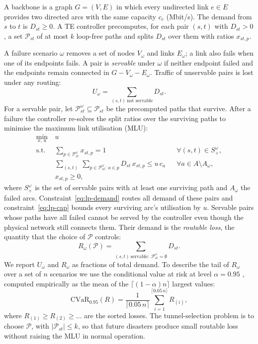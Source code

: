 \documentclass[preprint,12pt]{elsarticle}
\begin{document}
A backbone is a graph $G=(V,E)$ in which every undirected link $e\in E$ provides two directed arcs with the same capacity $c_e$ (Mbit/s). The demand from $s$ to $t$ is $D_{st}\ge 0$. A TE controller precomputes, for each pair $(s,t)$ with $D_{st}>0$, a set $\mathcal{P}_{st}$ of at most $k$ loop-free paths and splits $D_{st}$ over them with ratios $x_{st,p}$.

A failure scenario $\omega$ removes a set of nodes $V_\omega$ and links $E_\omega$; a link also fails when one of its endpoints fails. A pair is \emph{servable} under $\omega$ if neither endpoint failed and the endpoints remain connected in $G-V_\omega-E_\omega$. Traffic of unservable pairs is lost under any routing:
\begin{equation}
U_\omega=\sum_{(s,t)\ \text{not servable}} D_{st}.
\label{eq:unservable}
\end{equation}
For a servable pair, let $\mathcal{P}^{\omega}_{st}\subseteq\mathcal{P}_{st}$ be the precomputed paths that survive. After a failure the controller re-solves the split ratios over the surviving paths to minimise the maximum link utilisation (MLU):
\begin{align}
\min_{x,\,u}\ & u \label{eq:lp}\\
\text{s.t.}\ & \sum_{p\in\mathcal{P}^{\omega}_{st}} x_{st,p}=1 && \forall (s,t)\in S^\omega_{+}, \label{eq:lp-demand}\\
& \sum_{(s,t)}\ \sum_{p\in\mathcal{P}^{\omega}_{st}:\,a\in p} D_{st}\,x_{st,p}\le u\,c_a && \forall a\in A\setminus A_\omega, \label{eq:lp-cap}\\
& x_{st,p}\ge 0, \nonumber
\end{align}
where $S^\omega_{+}$ is the set of servable pairs with at least one surviving path and $A_\omega$ the failed arcs. Constraint~\eqref{eq:lp-demand} routes all demand of these pairs and constraint~\eqref{eq:lp-cap} bounds every surviving arc's utilisation by $u$. Servable pairs whose paths have all failed cannot be served by the controller even though the physical network still connects them. Their demand is the \emph{routable loss}, the quantity that the choice of $\mathcal{P}$ controls:
\begin{equation}
R_\omega(\mathcal{P})=\sum_{(s,t)\ \text{servable}:\ \mathcal{P}^{\omega}_{st}=\emptyset} D_{st}.
\label{eq:routable}
\end{equation}
We report $U_\omega$ and $R_\omega$ as fractions of total demand. To describe the tail of $R_\omega$ over a set of $n$ scenarios we use the conditional value at risk at level $\alpha=0.95$ \cite{cvar00}, computed empirically as the mean of the $\lceil(1-\alpha)n\rceil$ largest values:
\begin{equation}
\mathrm{CVaR}_{0.95}(R)=\frac{1}{\lceil 0.05\,n\rceil}\sum_{i=1}^{\lceil 0.05\,n\rceil} R_{(i)},
\label{eq:cvar}
\end{equation}
where $R_{(1)}\ge R_{(2)}\ge\dots$ are the sorted losses. The tunnel-selection problem is to choose $\mathcal{P}$, with $|\mathcal{P}_{st}|\le k$, so that future disasters produce small routable loss without raising the MLU in normal operation.
\end{document}
